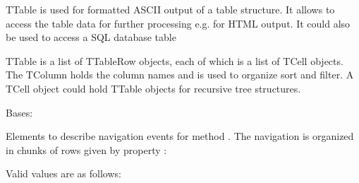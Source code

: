 \documentclass[letterpaper,10pt,english]{sphinxmanual}
\begin{document}
\sphinxAtStartPar
TTable is used for formatted ASCII output of a table structure.
It allows to access the table data for further processing e.g. for HTML output.
It could also be used to access a SQL database table

\sphinxAtStartPar
TTable is a list of TTableRow objects, each of which is a list of TCell objects.
The TColumn holds the column names and is used to organize sort and filter.
A TCell object could hold TTable objects for recursive tree structures.


\begin{savenotes}\begin{fulllineitems}
\label{\detokenize{eezz:eezz.table.TNavigation}}
\pysigstartsignatures
{}
\pysigstopsignatures
\sphinxAtStartPar
Bases: 

\sphinxAtStartPar
Elements to describe navigation events for method {\hyperref[\detokenize{eezz:eezz.table.TTable.navigate}]{}}. The navigation is
organized in chunks of rows given by property
{\hyperref[\detokenize{eezz:ttable-parameter-list}]{}}:

\sphinxAtStartPar
Valid values are as follows:

\begin{savenotes}\begin{fulllineitems}
\label{\detokenize{eezz:eezz.table.TNavigation.ABS}}
\pysigstartsignatures
{}
\pysigstopsignatures
\end{fulllineitems}\end{savenotes}


\begin{savenotes}\begin{fulllineitems}
\label{\detokenize{eezz:eezz.table.TNavigation.NEXT}}
\pysigstartsignatures
{}
\pysigstopsignatures
\end{fulllineitems}\end{savenotes}


\end{fulllineitems}
\end{savenotes}
\end{document}
